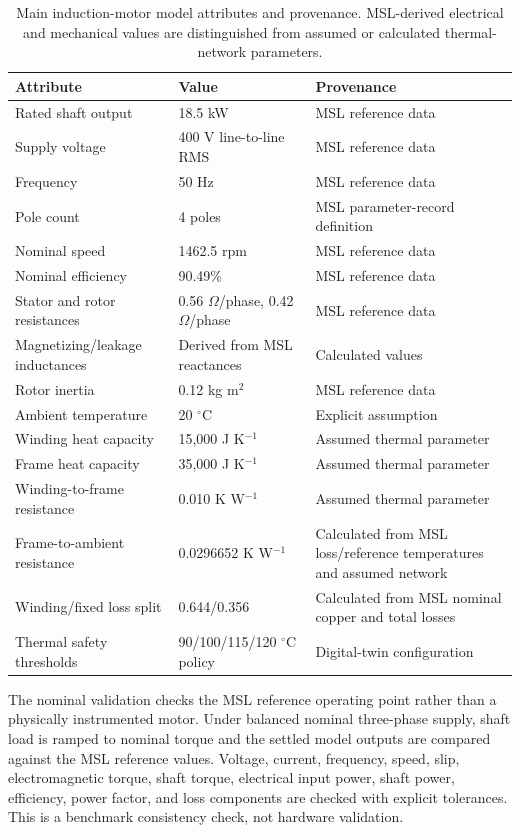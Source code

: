 \documentclass[machines,article,submit,moreauthors]{Definitions/mdpi}
\begin{document}
\begin{table}[H]
\caption{Main induction-motor model attributes and provenance. MSL-derived electrical and mechanical values are distinguished from assumed or calculated thermal-network parameters.\label{tab:parameters}}
\begin{tabularx}{\textwidth}{p{} p{} X}
\toprule
\textbf{Attribute} & \textbf{Value} & \textbf{Provenance} \\
\midrule
Rated shaft output & 18.5 kW & MSL reference data \\
Supply voltage & 400 V line-to-line RMS & MSL reference data \\
Frequency & 50 Hz & MSL reference data \\
Pole count & 4 poles & MSL parameter-record definition \\
Nominal speed & 1462.5 rpm & MSL reference data \\
Nominal efficiency & 90.49\% & MSL reference data \\
Stator and rotor resistances & 0.56 $\Omega$/phase, 0.42 $\Omega$/phase & MSL reference data \\
Magnetizing/leakage inductances & Derived from MSL reactances & Calculated values \\
Rotor inertia & 0.12 kg m$^{2}$ & MSL reference data \\
Ambient temperature & 20 $^{\circ}$C & Explicit assumption \\
Winding heat capacity & 15,000 J K$^{-1}$ & Assumed thermal parameter \\
Frame heat capacity & 35,000 J K$^{-1}$ & Assumed thermal parameter \\
Winding-to-frame resistance & 0.010 K W$^{-1}$ & Assumed thermal parameter \\
Frame-to-ambient resistance & 0.0296652 K W$^{-1}$ & Calculated from MSL loss/reference temperatures and assumed network \\
Winding/fixed loss split & 0.644/0.356 & Calculated from MSL nominal copper and total losses \\
Thermal safety thresholds & 90/100/115/120 $^{\circ}$C policy & Digital-twin configuration \\
\bottomrule
\end{tabularx}
\end{table}

The nominal validation checks the MSL reference operating point rather than a physically instrumented motor. Under balanced nominal three-phase supply, shaft load is ramped to nominal torque and the settled model outputs are compared against the MSL reference values. Voltage, current, frequency, speed, slip, electromagnetic torque, shaft torque, electrical input power, shaft power, efficiency, power factor, and loss components are checked with explicit tolerances. This is a benchmark consistency check, not hardware validation.
\end{document}
